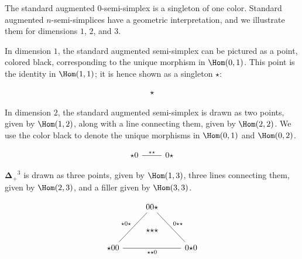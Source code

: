 \documentclass[10pt]{art.cls/art}
\newcommand{\DeltaPlus}{\ensuremath{\boldsymbol{\Delta}_+}}
\newcommand{\kstar}{{\star}}
\begin{document}
The standard augmented $0$-semi-simplex is a singleton of one color. Standard augmented $n$-semi-simplices have a geometric interpretation, and we illustrate them for dimensions $1$, $2$, and $3$.

\begin{example}[$\DeltaPlus^1$]
  In dimension $1$, the standard augmented semi-simplex can be pictured as a point, colored black, corresponding to the unique morphism in $\Hom(0, 1)$. This point is the identity in $\Hom(1, 1)$; it is hence shown as a singleton $\kstar$:

  \begin{equation*}
    \begin{tikzcd}
      \kstar
    \end{tikzcd}
  \end{equation*}
\end{example}

\begin{example}[$\DeltaPlus^2$]
  In dimension $2$, the standard augmented semi-simplex is drawn as two points, given by $\Hom(1, 2)$, along with a line connecting them, given by $\Hom(2, 2)$. We use the color black to denote the unique morphisms in $\Hom(0, 1)$ and $\Hom(0, 2)$.

  \begin{equation*}
    \begin{tikzcd}
      \kstar0 \arrow[r, dash, "\kstar\kstar"] & 0\kstar
    \end{tikzcd}
  \end{equation*}
\end{example}

\begin{example}[$\DeltaPlus^3$]
  $\DeltaPlus^3$ is drawn as three points, given by $\Hom(1, 3)$, three lines connecting them, given by $\Hom(2, 3)$, and a filler given by $\Hom(3, 3)$.

  \begin{equation*}
    \begin{tikzcd}
      & |[alias=F]|00\kstar \arrow[ddr, dash, "0\kstar\kstar"] & \\\\
      \kstar00 \arrow[rr, dash, "\kstar\kstar0"{name=T, below}]\arrow[uur, dash, "\kstar0\kstar"] && 0\kstar0 \\
      \arrow[rightarrow, from=F, to=T, phantom, "\kstar\kstar\kstar" description]
    \end{tikzcd}
  \end{equation*}
\end{example}
\end{document}

